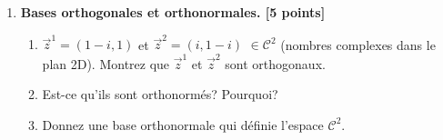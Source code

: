 \documentclass{article}
\begin{document}
\begin{enumerate}
\vspace{1cm}

\item {\bf Bases orthogonales et orthonormales. [5 points]} 
  \begin{enumerate}
    \item 
      $\overrightarrow{z}^1 = (1 - i, 1)$ et
      $\overrightarrow{z}^2 = (i, 1-i)$ $\in \mathcal{C}^2$ 
      (nombres complexes dans le
      plan 2D). Montrez que $\overrightarrow{z}^1$ et $\overrightarrow{z}^2$
      sont orthogonaux. 

  \item Est-ce qu'ils sont orthonormés? Pourquoi?
    
  \item Donnez une base orthonormale qui définie  l'espace
    $\mathcal{C}^2$.

  \end{enumerate}


\end{enumerate}
\end{document}
